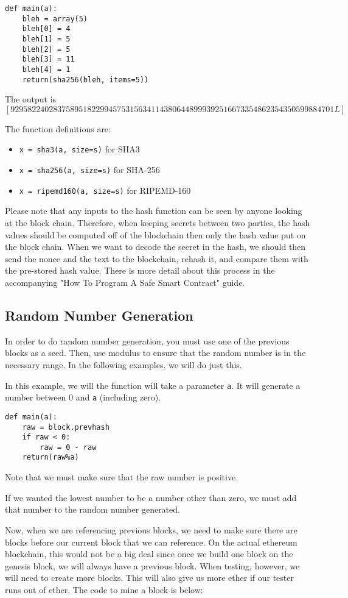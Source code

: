 \documentclass[12pt]{article}
\begin{document}
\begin{verbatim}
def main(a):
	bleh = array(5)
	bleh[0] = 4
	bleh[1] = 5
	bleh[2] = 5
	bleh[3] = 11
	bleh[4] = 1
	return(sha256(bleh, items=5))
\end{verbatim}
The output is $[9295822402837589518229945753156341143806448999392516673354862354350599884701L]$

The function definitions are:
\begin{itemize}
	\item \texttt{x = sha3(a, size=s)} for SHA3
	\item \texttt{x = sha256(a, size=s)} for SHA-256
	\item \texttt{x = ripemd160(a, size=s)} for RIPEMD-160
\end{itemize}

Please note that any inputs to the hash function can be seen by anyone looking at the block chain. Therefore, when keeping secrets between two parties, the hash values should be computed off of the blockchain then only the hash value put on the block chain. When we want to decode the secret in the hash, we should then send the nonce and the text to the blockchain, rehash it, and compare them with the pre-stored hash value. There is more detail about this process in the accompanying "How To Program A Safe Smart Contract" guide.

\subsection{Random Number Generation}
In order to do random number generation, you must use one of the previous blocks as a seed. Then, use modulus to ensure that the random number is in the necessary range. In the following examples, we will do just this.

In this example, we will the function will take a parameter \texttt{a}. It will generate a number between 0 and \texttt{a} (including zero).

\begin{verbatim}
def main(a):
	raw = block.prevhash
	if raw < 0:
		raw = 0 - raw
	return(raw%a)
\end{verbatim}

Note that we must make sure that the raw number is positive. \cite{PeterBorah2014}

If we wanted the lowest number to be a number other than zero, we must add that number to the random number generated. 

Now, when we are referencing previous blocks, we need to make sure there are blocks before our current block that we can reference. On the actual ethereum blockchain, this would not be a big deal since once we build one block on the genesis block, we will always have a previous block. When testing, however, we will need to create more blocks. This will also give us more ether if our tester runs out of ether. The code to mine a block is below:
\end{document}
